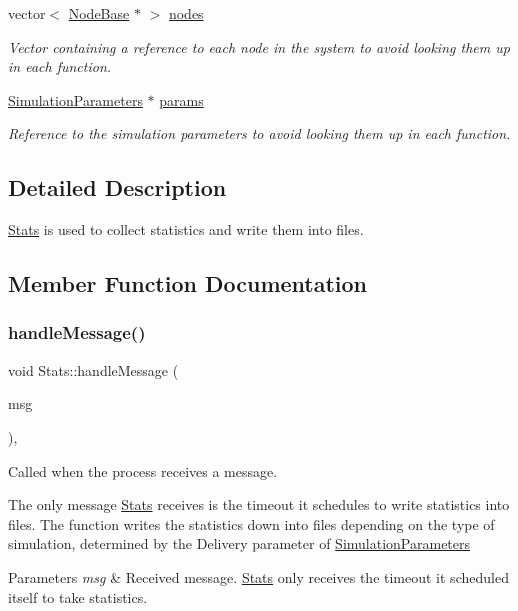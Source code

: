 \begin{DoxyCompactItemize}
vector$<$ \hyperlink{class_node_base}{Node\+Base} $\ast$ $>$ \hyperlink{class_stats_a815a3aa12c1529fe3d686038a2094fb2}{nodes}
\begin{DoxyCompactList}\small\item\em Vector containing a reference to each node in the system to avoid looking them up in each function. \end{DoxyCompactList}\item 
\hyperlink{class_simulation_parameters}{Simulation\+Parameters} $\ast$ \hyperlink{class_stats_aec7570f722a5a0c6ed5f6b7208331dc1}{params}
\begin{DoxyCompactList}\small\item\em Reference to the simulation parameters to avoid looking them up in each function. \end{DoxyCompactList}\end{DoxyCompactItemize}


\subsection{Detailed Description}
\hyperlink{class_stats}{Stats} is used to collect statistics and write them into files. 

\subsection{Member Function Documentation}
\mbox{\label{class_stats_adaf8eb884008cdcb1f8a08df41566d16}} 
\subsubsection{\texorpdfstring{handle\+Message()}{handleMessage()}}
{\footnotesize\ttfamily void Stats\+::handle\+Message (\begin{DoxyParamCaption}\item[{c\+Message $\ast$}]{msg }\end{DoxyParamCaption})\hspace{0.3cm}{\ttfamily [private]}, {\ttfamily [virtual]}}



Called when the process receives a message. 

The only message \hyperlink{class_stats}{Stats} receives is the timeout it schedules to write statistics into files. The function writes the statistics down into files depending on the type of simulation, determined by the Delivery parameter of \hyperlink{class_simulation_parameters}{Simulation\+Parameters} 
\begin{DoxyParams}{Parameters}
{\em msg} & Received message. \hyperlink{class_stats}{Stats} only receives the timeout it scheduled itself to take statistics. \\
\hline
\end{DoxyParams}
\mbox{\label{class_stats_a650afe7cc5721ec17cfdc94475365f89}} 
